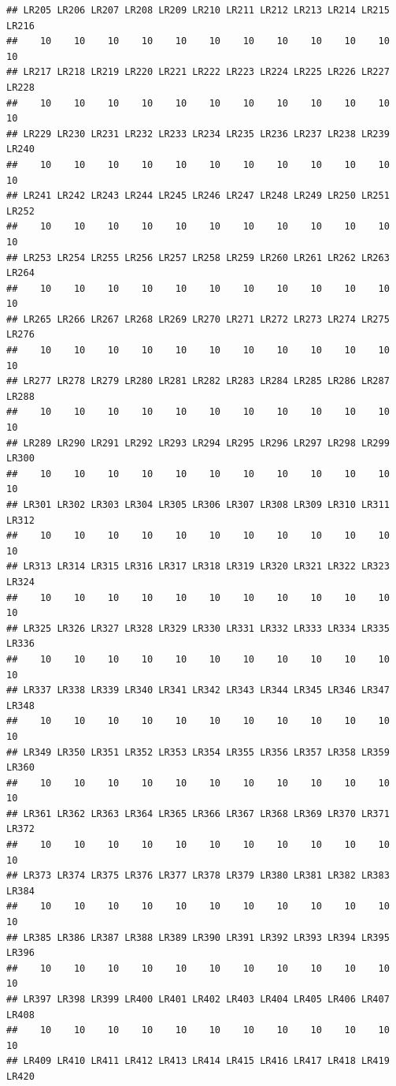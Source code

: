 \documentclass[]{book}
\begin{document}
\begin{verbatim}
## LR205 LR206 LR207 LR208 LR209 LR210 LR211 LR212 LR213 LR214 LR215 LR216 
##    10    10    10    10    10    10    10    10    10    10    10    10 
## LR217 LR218 LR219 LR220 LR221 LR222 LR223 LR224 LR225 LR226 LR227 LR228 
##    10    10    10    10    10    10    10    10    10    10    10    10 
## LR229 LR230 LR231 LR232 LR233 LR234 LR235 LR236 LR237 LR238 LR239 LR240 
##    10    10    10    10    10    10    10    10    10    10    10    10 
## LR241 LR242 LR243 LR244 LR245 LR246 LR247 LR248 LR249 LR250 LR251 LR252 
##    10    10    10    10    10    10    10    10    10    10    10    10 
## LR253 LR254 LR255 LR256 LR257 LR258 LR259 LR260 LR261 LR262 LR263 LR264 
##    10    10    10    10    10    10    10    10    10    10    10    10 
## LR265 LR266 LR267 LR268 LR269 LR270 LR271 LR272 LR273 LR274 LR275 LR276 
##    10    10    10    10    10    10    10    10    10    10    10    10 
## LR277 LR278 LR279 LR280 LR281 LR282 LR283 LR284 LR285 LR286 LR287 LR288 
##    10    10    10    10    10    10    10    10    10    10    10    10 
## LR289 LR290 LR291 LR292 LR293 LR294 LR295 LR296 LR297 LR298 LR299 LR300 
##    10    10    10    10    10    10    10    10    10    10    10    10 
## LR301 LR302 LR303 LR304 LR305 LR306 LR307 LR308 LR309 LR310 LR311 LR312 
##    10    10    10    10    10    10    10    10    10    10    10    10 
## LR313 LR314 LR315 LR316 LR317 LR318 LR319 LR320 LR321 LR322 LR323 LR324 
##    10    10    10    10    10    10    10    10    10    10    10    10 
## LR325 LR326 LR327 LR328 LR329 LR330 LR331 LR332 LR333 LR334 LR335 LR336 
##    10    10    10    10    10    10    10    10    10    10    10    10 
## LR337 LR338 LR339 LR340 LR341 LR342 LR343 LR344 LR345 LR346 LR347 LR348 
##    10    10    10    10    10    10    10    10    10    10    10    10 
## LR349 LR350 LR351 LR352 LR353 LR354 LR355 LR356 LR357 LR358 LR359 LR360 
##    10    10    10    10    10    10    10    10    10    10    10    10 
## LR361 LR362 LR363 LR364 LR365 LR366 LR367 LR368 LR369 LR370 LR371 LR372 
##    10    10    10    10    10    10    10    10    10    10    10    10 
## LR373 LR374 LR375 LR376 LR377 LR378 LR379 LR380 LR381 LR382 LR383 LR384 
##    10    10    10    10    10    10    10    10    10    10    10    10 
## LR385 LR386 LR387 LR388 LR389 LR390 LR391 LR392 LR393 LR394 LR395 LR396 
##    10    10    10    10    10    10    10    10    10    10    10    10 
## LR397 LR398 LR399 LR400 LR401 LR402 LR403 LR404 LR405 LR406 LR407 LR408 
##    10    10    10    10    10    10    10    10    10    10    10    10 
## LR409 LR410 LR411 LR412 LR413 LR414 LR415 LR416 LR417 LR418 LR419 LR420 

\end{verbatim}
\end{document}
